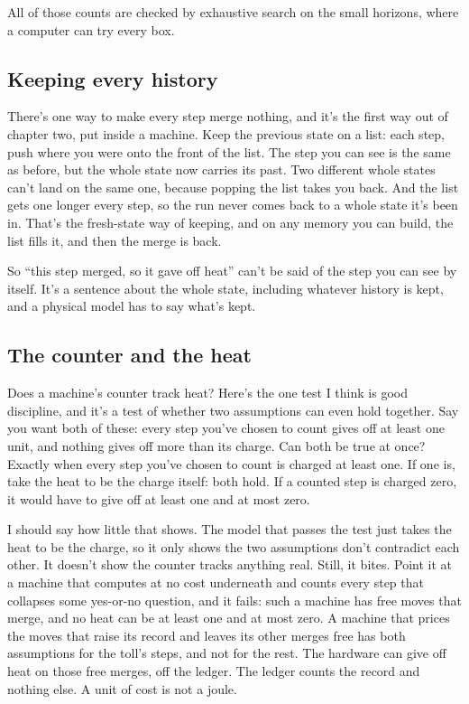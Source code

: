 \documentclass[11pt,twoside]{article}
\theoremstyle{thielethm}
\theoremstyle{thieledef}
\theoremstyle{thieledef}
\theoremstyle{thieledef}
\theoremstyle{thielethm}
\theoremstyle{thieleobs}
\theoremstyle{thielethm}
\begin{document}
All of those counts are checked by exhaustive search on the small horizons, where a computer can try every box.

\subsection{Keeping every history}

There's one way to make every step merge nothing, and it's the first way out of chapter two, put inside a machine. Keep the previous state on a list: each step, push where you were onto the front of the list. The step you can see is the same as before, but the whole state now carries its past. Two different whole states can't land on the same one, because popping the list takes you back. And the list gets one longer every step, so the run never comes back to a whole state it's been in. That's the fresh-state way of keeping, and on any memory you can build, the list fills it, and then the merge is back.

So ``this step merged, so it gave off heat'' can't be said of the step you can see by itself. It's a sentence about the whole state, including whatever history is kept, and a physical model has to say what's kept.

\subsection{The counter and the heat}

Does a machine's counter track heat? Here's the one test I think is good discipline, and it's a test of whether two assumptions can even hold together. Say you want both of these: every step you've chosen to count gives off at least one unit, and nothing gives off more than its charge. Can both be true at once? Exactly when every step you've chosen to count is charged at least one. If one is, take the heat to be the charge itself: both hold. If a counted step is charged zero, it would have to give off at least one and at most zero.

I should say how little that shows. The model that passes the test just takes the heat to be the charge, so it only shows the two assumptions don't contradict each other. It doesn't show the counter tracks anything real. Still, it bites. Point it at a machine that computes at no cost underneath and counts every step that collapses some yes-or-no question, and it fails: such a machine has free moves that merge, and no heat can be at least one and at most zero. A machine that prices the moves that raise its record and leaves its other merges free has both assumptions for the toll's steps, and not for the rest. The hardware can give off heat on those free merges, off the ledger. The ledger counts the record and nothing else. A unit of cost is not a joule.
\end{document}
